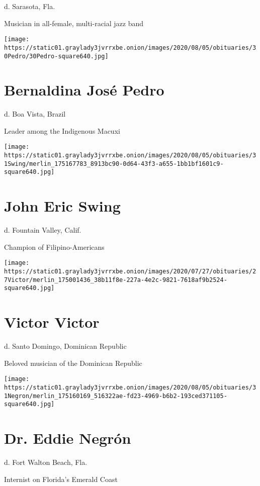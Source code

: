 d. Sarasota, Fla.

Musician in all-female, multi-racial jazz band

\texttt{[image: https://static01.graylady3jvrrxbe.onion/images/2020/08/05/obituaries/30Pedro/30Pedro-square640.jpg]}

\hypertarget{bernaldina-josuxe9-pedro}{%
\section{Bernaldina José Pedro}\label{bernaldina-josuxe9-pedro}}

d. Boa Vista, Brazil

Leader among the Indigenous Macuxi

\texttt{[image: https://static01.graylady3jvrrxbe.onion/images/2020/08/05/obituaries/31Swing/merlin\_175167783\_8913bc90-0d64-43f3-a655-1bb1bf1601c9-square640.jpg]}

\hypertarget{john-eric-swing}{%
\section{John Eric Swing}\label{john-eric-swing}}

d. Fountain Valley, Calif.

Champion of Filipino-Americans

\texttt{[image: https://static01.graylady3jvrrxbe.onion/images/2020/07/27/obituaries/27Victor/merlin\_175001436\_38b11f8e-227a-4e2c-9821-7618af9b2524-square640.jpg]}

\hypertarget{victor-victor}{%
\section{Victor Victor}\label{victor-victor}}

d. Santo Domingo, Dominican Republic

Beloved musician of the Dominican Republic

\texttt{[image: https://static01.graylady3jvrrxbe.onion/images/2020/08/05/obituaries/31Negron/merlin\_175160169\_516322ae-fd23-4969-b6b2-193ced371105-square640.jpg]}

\hypertarget{dr-eddie-negruxf3n}{%
\section{Dr. Eddie Negrón}\label{dr-eddie-negruxf3n}}

d. Fort Walton Beach, Fla.

Internist on Florida's Emerald Coast

